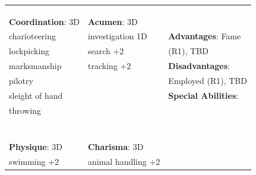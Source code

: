 \documentclass[10pt]{article}
\begin{document}
\begin{table}
\begin{tabular}{m{156pt} m{156pt} m{156pt}}
 \hrulefill &  \hrulefill & \\

 \hrulefill &  \hrulefill & \\

 \hrulefill &  \hrulefill & \\


\textbf{Coordination}: 3D \hrulefill & \textbf{Acumen}: 3D \hrulefill     & \hrulefill \\

charioteering        \hrulefill & investigation     1D \hrulefill & \textbf{Advantages}: Fame \hrulefill \\

lockpicking          \hrulefill & search            +2 \hrulefill & (R1), TBD \hrulefill \\

marksmanship         \hrulefill & tracking          +2 \hrulefill & \textbf{Disadvantages}: \hrulefill \\

pilotry              \hrulefill &  \hrulefill & Employed (R1), TBD \hrulefill \\

sleight of hand      \hrulefill &  \hrulefill & \textbf{Special Abilities}: \hrulefill \\

throwing             \hrulefill &  \hrulefill &  \hrulefill \\

 \hrulefill &  \hrulefill &  \hrulefill \\

 \hrulefill &  \hrulefill &  \hrulefill \\

 \hrulefill &  \hrulefill &  \hrulefill \\

 \hrulefill &  \hrulefill &  \hrulefill \\

 \hrulefill &  \hrulefill &  \hrulefill \\

 \hrulefill &  \hrulefill &  \hrulefill \\

 \hrulefill &  \hrulefill &  \hrulefill \\


\textbf{Physique}: 3D \hrulefill & \textbf{Charisma}: 3D \hrulefill     &  \hrulefill \\

swimming          +2 \hrulefill & animal handling   +2 \hrulefill &  \hrulefill \\


\end{tabular}
\end{table}
\end{document}
